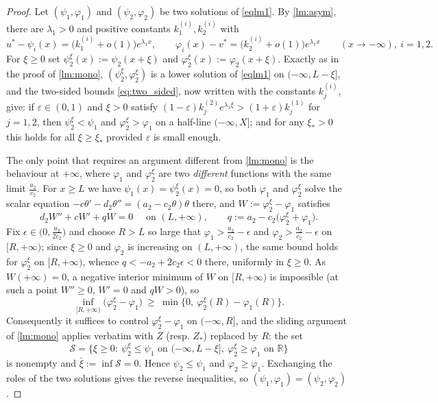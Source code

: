 \documentclass[reqno]{amsart}
\theoremstyle{plain}
\theoremstyle{definition}
\theoremstyle{remark}
\begin{document}
\begin{proof}
	Let $(\psi_1,\varphi_1)$ and $(\psi_2,\varphi_2)$ be two solutions of
	\eqref{eqlm1}. By \cref{lm:asym}, there are $\lambda_1>0$ and positive
	constants $k_1^{(i)},k_2^{(i)}$ with
	\[
	u^*-\psi_i(x)=\big(k_1^{(i)}+o(1)\big)e^{\lambda_1x},
	\qquad
	\varphi_i(x)-v^*=\big(k_2^{(i)}+o(1)\big)e^{\lambda_1x}\qquad(x\to-\infty),\ i=1,2 .
	\]
	For $\xi\ge0$ set $\psi_2^\xi(x):=\psi_2(x+\xi)$ and
	$\varphi_2^\xi(x):=\varphi_2(x+\xi)$. Exactly as in the proof of
	\cref{lm:mono}, $(\psi_2^\xi,\varphi_2^\xi)$ is a lower solution of
	\eqref{eqlm1} on $(-\infty,L-\xi]$, and the two-sided bounds
	\eqref{eq:two_sided}, now written with the constants $k_j^{(i)}$, give: if
	$\varepsilon\in(0,1)$ and $\xi>0$ satisfy
	$(1-\varepsilon)k_j^{(2)}e^{\lambda_1\xi}>(1+\varepsilon)k_j^{(1)}$ for
	$j=1,2$, then $\psi_2^\xi<\psi_1$ and $\varphi_2^\xi>\varphi_1$ on a half-line
	$(-\infty,X]$; and for any $\xi_*>0$ this holds for all $\xi\ge\xi_*$ provided
	$\varepsilon$ is small enough.

	The only point that requires an argument different from \cref{lm:mono} is the
	behaviour at $+\infty$, where $\varphi_1$ and $\varphi_2^\xi$ are two
	\emph{different} functions with the same limit $\frac{a_2}{c_2}$. For
	$x\ge L$ we have $\psi_1(x)=\psi_2^\xi(x)=0$, so both $\varphi_1$ and
	$\varphi_2^\xi$ solve the scalar equation
	$-c\theta'-d_2\theta''=(a_2-c_2\theta)\theta$ there, and
	$W:=\varphi_2^\xi-\varphi_1$ satisfies
	\[
	d_2W''+cW'+qW=0 \quad\text{ on }(L,+\infty),
	\qquad q:=a_2-c_2\big(\varphi_2^\xi+\varphi_1\big).
	\]
	Fix $\epsilon\in\big(0,\frac{a_2}{2c_2}\big)$ and choose $R>L$ so large that
	$\varphi_1>\frac{a_2}{c_2}-\epsilon$ and $\varphi_2>\frac{a_2}{c_2}-\epsilon$
	on $[R,+\infty)$; since $\xi\ge0$ and $\varphi_2$ is increasing on
	$(L,+\infty)$, the same bound holds for $\varphi_2^\xi$ on $[R,+\infty)$,
	whence $q<-a_2+2c_2\epsilon<0$ there, uniformly in $\xi\ge0$. As
	$W(+\infty)=0$, a negative interior minimum of $W$ on $[R,+\infty)$ is
	impossible (at such a point $W''\ge0$, $W'=0$ and $qW>0$), so
	\begin{equation}\label{eq:tail}
		\inf_{[R,+\infty)}\big(\varphi_2^\xi-\varphi_1\big)\ \ge\
		\min\big\{0,\ \varphi_2^\xi(R)-\varphi_1(R)\big\} .
	\end{equation}
	Consequently it suffices to control $\varphi_2^\xi-\varphi_1$ on
	$(-\infty,R]$, and the sliding argument of \cref{lm:mono} applies verbatim
	with $Z$ (resp. $Z_*$) replaced by $R$: the set
	\[
	\mathcal S=\big\{\xi\ge0:\ \psi_2^\xi\le\psi_1 \text{ on }(-\infty,L-\xi],\
	\varphi_2^\xi\ge\varphi_1 \text{ on }\mathbb{R}\big\}
	\]
	is nonempty and $\bar\xi:=\inf\mathcal S=0$. Hence $\psi_2\le\psi_1$ and
	$\varphi_2\ge\varphi_1$. Exchanging the roles of the two solutions gives the
	reverse inequalities, so $(\psi_1,\varphi_1)=(\psi_2,\varphi_2)$.
\end{proof}
\end{document}

